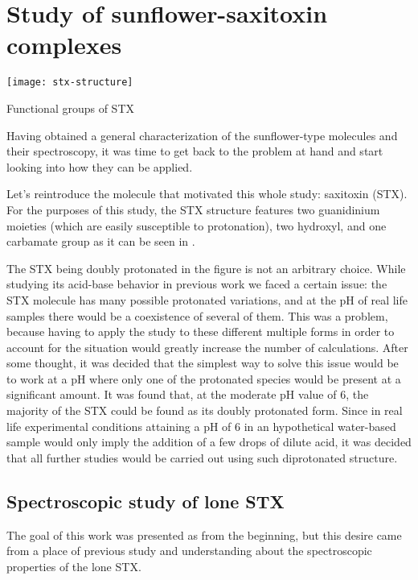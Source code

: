 \chapter{Study of sunflower-saxitoxin complexes}

\begin{marginfigure}
    \texttt{[image: stx-structure]}
    \caption[Functional groups of STX]{Functional groups of STX}
\end{marginfigure}

Having obtained a general characterization of the sunflower-type molecules and their spectroscopy, it was time to get back to the problem at hand and start looking into how they can be applied.

Let's reintroduce the molecule that motivated this whole study: saxitoxin (STX).
For the purposes of this study, the STX structure features two guanidinium moieties (which are easily susceptible to protonation), two hydroxyl, and one carbamate group as it can be seen in .

The STX being doubly protonated in the figure is not an arbitrary choice.
While studying its acid-base behavior in previous work we faced a certain issue: the STX molecule has many possible protonated variations, and at the pH of real life samples there would be a coexistence of several of them.
This was a problem, because having to apply the study to these different multiple forms in order to account for the situation would greatly increase the number of calculations.
After some thought, it was decided that the simplest way to solve this issue would be to work at a pH where only one of the protonated species would be present at a significant amount.
It was found that, at the moderate pH value of 6, the majority of the STX could be found as its doubly protonated form.
Since in real life experimental conditions attaining a pH of 6 in an hypothetical water-based sample would only imply the addition of a few drops of dilute acid, it was decided that all further studies would be carried out using such diprotonated structure.

\section{Spectroscopic study of lone STX}
The goal of this work was presented as  from the beginning, but this desire came from a place of previous study and understanding about the spectroscopic properties of the lone STX.

